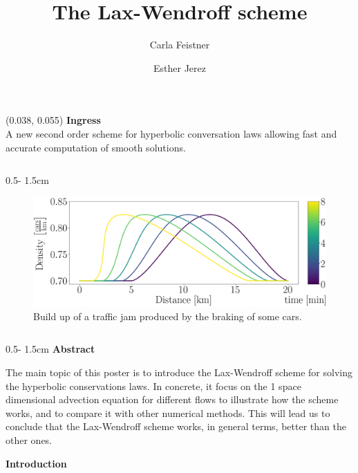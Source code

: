 \documentclass{uibposter}
\title{The Lax-Wendroff scheme}
\author
{%
    Carla Feistner 
    \and
    Esther Jerez
}
\institute
{
    Department of mathematics -- University of Bergen
}
\begin{document}
\begin{textblock}{0.5}(0.038, 0.055)
    \color{white}
    \sffamily
    \textbf{Ingress}
    \\
A new second order scheme for hyperbolic conversation laws allowing fast and accurate computation of smooth solutions. 
\end{textblock}

\begin{frame}[fragile]

\begin{columns}
\begin{column}{0.5\textwidth - 1.5cm}
    \begin{figure}[h]
    \includegraphics[width=\textwidth]{fig/traffic_motivation_laxW_continous.png} \caption{Build up of a traffic jam produced by the braking of some cars.} \label{img:traffic_flow_motivation}	
    \end{figure}
    \vspace{0.5cm}

\begin{column}{0.5\textwidth - 1.5cm}
\textbf{Abstract}
\vspace{0.5cm}

The main topic of this poster is to introduce the Lax-Wendroff scheme for solving the hyperbolic conservations laws. In concrete, it focus on the 1 space dimensional advection equation for different flows to illustrate how the scheme works, and to compare it with other numerical methods. This will lead us to conclude that the Lax-Wendroff scheme works, in general terms, better than the other ones.

\vspace{0.5cm}
\textbf{Introduction}
\vspace{0.5cm}


\end{column}
\end{column}
\end{columns}
\end{frame}
\end{document}

